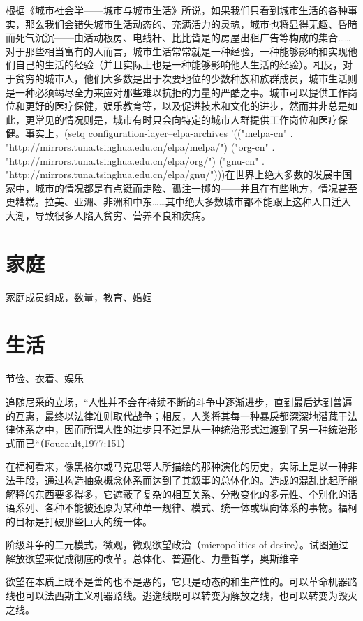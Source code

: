 根据《城市社会学——城市与城市生活》所说，如果我们只看到城市生活的各种事实，那么我们会错失城市生活动态的、充满活力的灵魂，城市也将显得无趣、昏暗而死气沉沉——由活动板房、电线杆、比比皆是的房屋出租广告等构成的集合…… 对于那些相当富有的人而言，城市生活常常就是一种经验，一种能够影响和实现他们自己的生活的经验（并且实际上也是一种能够影响他人生活的经验）。相反，对于贫穷的城市人，他们大多数是出于次要地位的少数种族和族群成员，城市生活则是一种必须竭尽全力来应对那些难以抗拒的力量的严酷之事。城市可以提供工作岗位和更好的医疗保健，娱乐教育等，以及促进技术和文化的进步，然而并非总是如此，更常见的情况则是，城市有时只会向特定的城市人群提供工作岗位和医疗保健。事实上，(setq configuration-layer--elpa-archives '(("melpa-cn" . "http://mirrors.tuna.tsinghua.edu.cn/elpa/melpa/") ("org-cn" . "http://mirrors.tuna.tsinghua.edu.cn/elpa/org/") ("gnu-cn" . "http://mirrors.tuna.tsinghua.edu.cn/elpa/gnu/")))在世界上绝大多数的发展中国家中，城市的情况都是有点铤而走险、孤注一掷的——并且在有些地方，情况甚至更糟糕。拉美、亚洲、非洲和中东……其中绝大多数城市都不能跟上这种人口迁入大潮，导致很多人陷入贫穷、营养不良和疾病。

\section{家庭}家庭成员组成，数量，教育、婚姻

\section{生活}节俭、衣着、娱乐


追随尼采的立场，“人性并不会在持续不断的斗争中逐渐进步，直到最后达到普遍的互惠，最终以法律准则取代战争；相反，人类将其每一种暴戾都深深地潜藏于法律体系之中，因而所谓人性的进步只不过是从一种统治形式过渡到了另一种统治形式而已“（Foucault,1977:151）


在福柯看来，像黑格尔或马克思等人所描绘的那种演化的历史，实际上是以一种非法手段，通过构造抽象概念体系而达到了其叙事的总体化的。造成的混乱比起所能解释的东西要多得多，它遮蔽了复杂的相互关系、分散变化的多元性、个别化的话语系列、各种不能被还原为某种单一规律、模式、统一体或纵向体系的事物。福柯的目标是打破那些巨大的统一体。

阶级斗争的二元模式，微观，微观欲望政治（micropolitics of desire）。试图通过解放欲望来促成彻底的改革。总体化、普遍化、力量哲学，奥斯维辛

欲望在本质上既不是善的也不是恶的，它只是动态的和生产性的。可以革命机器路线也可以法西斯主义机器路线。逃逸线既可以转变为解放之线，也可以转变为毁灭之线。

